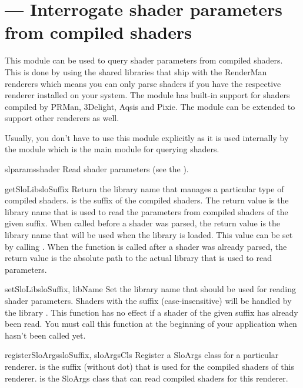 
\section{ ---
         Interrogate shader parameters from compiled shaders}

This module can be used to query shader parameters from compiled shaders.
This is done by using the shared libraries that ship with the
RenderMan renderers which means you can only parse shaders if
you have the respective renderer installed on your system. The module has
built-in support for shaders compiled by PRMan, 3Delight, Aqsis and
Pixie. The module can be extended to support other renderers as well.

Usually, you don't have to use this module explicitly as it is used internally
by the  module which is the main module for querying shaders.

\begin{funcdesc}{slparams}{shader}
Read shader parameters (see the ).
\end{funcdesc}

\begin{funcdesc}{getSloLib}{sloSuffix}
Return the library name that manages a particular type of compiled shaders.
 is the suffix of the compiled shaders.
The return value is the library name that is used to read the parameters
from compiled shaders of the given suffix. When called before a shader
was parsed, the return value is the library name that will be used when
the library is loaded. This value can be set by calling
. When the function is called after a shader was already parsed, the
return value is the absolute path to the actual library that is used
to read parameters.
\end{funcdesc}

\begin{funcdesc}{setSloLib}{sloSuffix, libName}
Set the library name that should be used for reading shader parameters.
Shaders with the suffix  (case-insensitive) will be handled by
the library . This function has no effect if a shader
of the given suffix has already been read. You must call this function at the beginning
of your application when  hasn't been called yet.
\end{funcdesc}

\begin{funcdesc}{registerSloArgs}{sloSuffix, sloArgsCls}
Register a SloArgs class for a particular renderer.
 is the suffix (without dot) that is used for the compiled
shaders of this renderer.  is the SloArgs class that
can read compiled shaders for this renderer.
\end{funcdesc}
